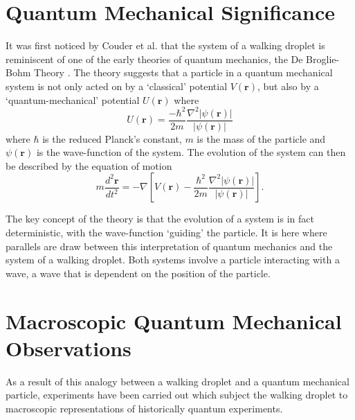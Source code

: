 \documentclass[11pt,twocolumn]{article}
\begin{document}

\section{Quantum Mechanical Significance}
\label{sec:quantummechanicalsignificance}
It was first noticed by Couder et al.\cite{1} that the system of a walking droplet is reminiscent of one of the early theories of quantum mechanics, the De Broglie-Bohm Theory \cite{17}.  The theory suggests that a particle in a quantum mechanical system is not only acted on by a `classical' potential $V(\bm{r})$, but also by a `quantum-mechanical' potential $U(\bm{r})$ where
\begin{equation}
    \label{qmpotential}
    U(\bm{r})=\frac{-\hbar^2}{2m}\frac{\nabla^2\left|\psi(\bm{r})\right|}{\left|\psi(\bm{r})\right|}
\end{equation}
where $\hbar$ is the reduced Planck's constant, $m$ is the mass of the particle and $\psi(\bm{r})$ is the wave-function of the system.  The evolution of the system can then be described by the equation of motion
\begin{equation}
    \label{qmeqofmotion}
    m\frac{d^2\bm{r}}{dt^2}=-\nabla\left[V(\bm{r})-\frac{\hbar^2}{2m}\frac{\nabla^2\left|\psi(\bm{r})\right|}{\left|\psi(\bm{r})\right|}\right].
\end{equation}

The key concept of the theory is that the evolution of a system is in fact deterministic, with the wave-function `guiding' the particle.  It is here where parallels are draw between this interpretation of quantum mechanics and the system of a walking droplet.  Both systems involve a particle interacting with a wave, a wave that is dependent on the position of the particle.

\section{Macroscopic Quantum Mechanical Observations}
\label{sec:macroscopicquantummechanicalobservations}
As a result of this analogy between a walking droplet and a quantum mechanical particle, experiments have been carried out which subject the walking droplet to macroscopic representations of historically quantum experiments.
\end{document}
